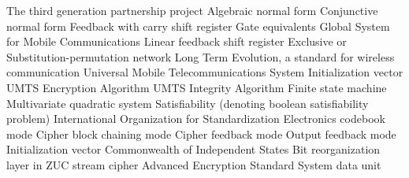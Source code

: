 % 
% 

\printnomenclature
{} {The third generation partnership project}
  {Algebraic normal form}
  {Conjunctive normal form}
 {Feedback with carry shift register}
   {Gate equivalents}
  {Global System for Mobile Communications}
 {Linear feedback shift register}
  {Exclusive or}
  {Substitution-permutation network}
  {Long Term Evolution, a standard for wireless communication}
 {Universal Mobile Telecommunications System}
   {Initialization vector}
  {UMTS Encryption Algorithm}
  {UMTS Integrity Algorithm}
  {Finite state machine}
   {Multivariate quadratic system}
  {Satisfiability (denoting boolean satisfiability problem)}
  {International Organization for Standardization}
  {Electronics codebook mode}
  {Cipher block chaining mode}
  {Cipher feedback mode}
  {Output feedback mode}
   {Initialization vector}
  {Commonwealth of Independent States}
   {Bit reorganization layer in ZUC stream cipher}
  {Advanced Encryption Standard}
  {System data unit}


